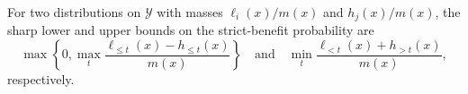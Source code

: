 For two distributions on \(\mathcal Y\) with masses \(\ell_i(x)/m(x)\) and \(h_j(x)/m(x)\), the sharp lower and upper bounds on the strict-benefit probability are
\[
\max\left\{0,\max_t\frac{\ell_{\le t}(x)-h_{\le t}(x)}{m(x)}\right\}
\quad\text{and}\quad
\min_t\frac{\ell_{<t}(x)+h_{>t}(x)}{m(x)},
\]
respectively.